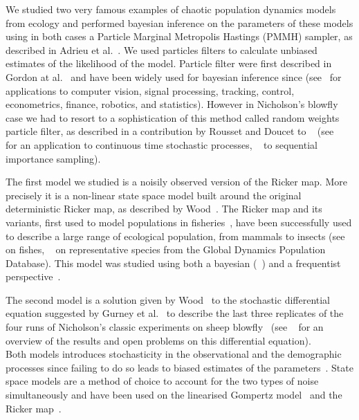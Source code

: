 \documentclass[12pt]{article}
\begin{document}
	We studied two very famous examples of chaotic population dynamics models from ecology and performed bayesian inference on the parameters of these models using in both cases a Particle Marginal Metropolis Hastings (PMMH) sampler, as described in Adrieu et al.~\cite{andrieu2010particle}. We used particles filters to calculate unbiased estimates of the likelihood of the model. Particle filter were first described in Gordon at al.~\cite{gordon1993novel} and have been widely used for bayesian inference since (see~\cite{ristic2004beyond, cappe2006inference, smith2013sequential, liu2008monte} for applications to computer vision, signal processing, tracking, control, econometrics,   finance, robotics,  and  statistics). However in Nicholson's blowfly case we had to resort to a sophistication of this method called random weights particle filter, as described in a contribution by Rousset and Doucet to ~\cite{beskos2006exact} (see ~\cite{fearnhead2010random} for an application to continuous time stochastic processes, ~\cite{fearnhead2008particle} to sequential importance sampling).
	
	The first model we studied is a noisily observed version of the Ricker map. More precisely it is a non-linear state space model built around the original deterministic Ricker map, as described by Wood~\cite{wood2010statistical}. The Ricker map and its variants, first used to model populations in fisheries~\cite{Ricker1954}, have been successfully used to describe a large range of ecological population, from mammals to insects (see~\cite{myers1999maximu, mueter2002opposite, krkovsek2007decliningm} on fishes, ~\cite{sibly2005regulation, gao2012bayesian} on representative species from the Global Dynamics Population Database). This model was studied using both a bayesian (~\cite{wood2010statistical, gao2012bayesian, fasiolo2014statistical}) and a frequentist perspective~\cite{sibly2005regulation, yang2008importance}.
	
	The second model is a solution given by Wood~\cite{wood2010statistical} to the stochastic differential equation suggested by Gurney et al.~\cite{gurney1980nicholson} to describe the last three replicates of the four runs of Nicholson’s classic experiments on sheep blowfly~\cite{nicholson1954outline, nicholson1957self} (see ~\cite{berezansky2010nicholson} for an overview of the results and open problems on this differential equation). \\
	Both models introduces stochasticity in the observational and the demographic processes since failing to do so leads to biased estimates of the parameters~\cite{stenseth2003seasonality, carroll2006measurement, freckleton2006census}. State space models are a method of choice to account for the two types of noise simultaneously and have been used on the linearised Gompertz model~\cite{meyer1999bugs, viljugrein2005density, wang2006spatial} and the Ricker map~\cite{de2002fitting, calder2003incorporating}.
	
\end{document}
